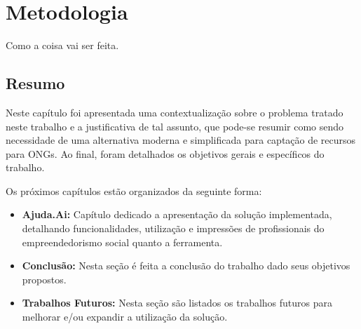 \chapter{Metodologia}

Como a coisa vai ser feita.



\section*{Resumo}
Neste capítulo foi apresentada uma contextualização sobre o problema tratado neste trabalho e a justificativa de tal assunto, que pode-se resumir como sendo necessidade de uma alternativa moderna e simplificada para captação de recursos para ONGs. Ao final, foram detalhados os objetivos gerais e específicos do trabalho.

Os próximos capítulos estão organizados da seguinte forma:

\begin{itemize}
  \item \textbf{Ajuda.Ai:} Capítulo dedicado a apresentação da solução implementada, detalhando funcionalidades, utilização e impressões de profissionais do empreendedorismo social quanto a ferramenta.
  \item \textbf{Conclusão:} Nesta seção é feita a conclusão do trabalho dado seus objetivos propostos.
  \item \textbf{Trabalhos Futuros:} Nesta seção são listados os trabalhos futuros para melhorar e/ou expandir a utilização da solução.
\end{itemize}